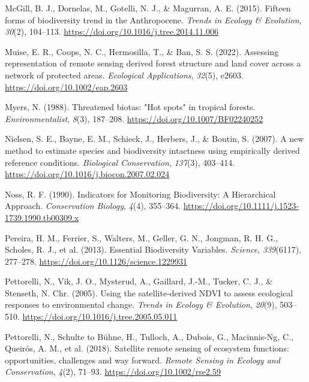 \documentclass[
]{agujournal2019}
\newlength{\cslhangindent}
\newenvironment{CSLReferences}[2] %
 {\begin{list}{}{%
  \setlength{\itemindent}{0pt}
  \setlength{\leftmargin}{0pt}
  \setlength{\parsep}{0pt}
  \ifodd #1
   \setlength{\leftmargin}{\cslhangindent}
   \setlength{\itemindent}{-1\cslhangindent}
  \fi
  \setlength{\itemsep}{#2\baselineskip}}}
 {\end{list}}
\begin{document}
\begin{CSLReferences}{1}{0}
McGill, B. J., Dornelas, M., Gotelli, N. J., \& Magurran, A. E. (2015).
Fifteen forms of biodiversity trend in the Anthropocene. \emph{Trends in
Ecology \& Evolution}, \emph{30}(2), 104--113.
\url{https://doi.org/10.1016/j.tree.2014.11.006}

Muise, E. R., Coops, N. C., Hermosilla, T., \& Ban, S. S. (2022).
Assessing representation of remote sensing derived forest structure and
land cover across a network of protected areas. \emph{Ecological
Applications}, \emph{32}(5), e2603.
\url{https://doi.org/10.1002/eap.2603}

Myers, N. (1988). Threatened biotas: {"}Hot spots{"} in tropical
forests. \emph{Environmentalist}, \emph{8}(3), 187--208.
\url{https://doi.org/10.1007/BF02240252}

Nielsen, S. E., Bayne, E. M., Schieck, J., Herbers, J., \& Boutin, S.
(2007). A new method to estimate species and biodiversity intactness
using empirically derived reference conditions. \emph{Biological
Conservation}, \emph{137}(3), 403--414.
\url{https://doi.org/10.1016/j.biocon.2007.02.024}

Noss, R. F. (1990). Indicators for Monitoring Biodiversity: A
Hierarchical Approach. \emph{Conservation Biology}, \emph{4}(4),
355--364. \url{https://doi.org/10.1111/j.1523-1739.1990.tb00309.x}

Pereira, H. M., Ferrier, S., Walters, M., Geller, G. N., Jongman, R. H.
G., Scholes, R. J., et al. (2013). Essential Biodiversity Variables.
\emph{Science}, \emph{339}(6117), 277--278.
\url{https://doi.org/10.1126/science.1229931}

Pettorelli, N., Vik, J. O., Mysterud, A., Gaillard, J.-M., Tucker, C.
J., \& Stenseth, N. Chr. (2005). Using the satellite-derived NDVI to
assess ecological responses to environmental change. \emph{Trends in
Ecology \& Evolution}, \emph{20}(9), 503--510.
\url{https://doi.org/10.1016/j.tree.2005.05.011}

Pettorelli, N., Schulte to Bühne, H., Tulloch, A., Dubois, G.,
Macinnis-Ng, C., Queirós, A. M., et al. (2018). Satellite remote sensing
of ecosystem functions: opportunities, challenges and way forward.
\emph{Remote Sensing in Ecology and Conservation}, \emph{4}(2), 71--93.
\url{https://doi.org/10.1002/rse2.59}


\end{CSLReferences}
\end{document}
